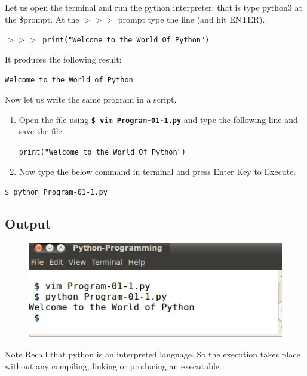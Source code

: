 \documentclass[11pt,a4paper]{article}
\begin{document}
\begin{description}
Let us open the terminal and run the python interpreter: that is type python3 at the \$prompt. At the $>>>$ prompt type the line (and hit ENTER).

\texttt{$>>>$ print("Welcome to the World Of Python")}

It produces the following result:

\texttt{Welcome to the World of Python}

Now let us write the same program in a script.

\begin{enumerate}
    \item Open the file using \textbf{\texttt{\$ vim Program-01-1.py}} and type the following line and save the file.

\texttt{print("Welcome to the World Of Python")}

\item Now type the below command in terminal and press Enter Key to Execute.
\end{enumerate}
\texttt{\$ python Program-01-1.py }

\subsection*{Output}

\begin{figure}[ht]
\begin{center}
\includegraphics[scale=0.6]{Output-Program-01-1.png}
\end{center}
\end{figure}

\end{description}

\begin{bclogo}[couleur=blue!5, arrondi=0.3, logo=\bctrombone]{Note}
Recall that python is an interpreted language. So the execution takes place without any compiling, linking or producing an executable.
\end{bclogo}
\end{document}
